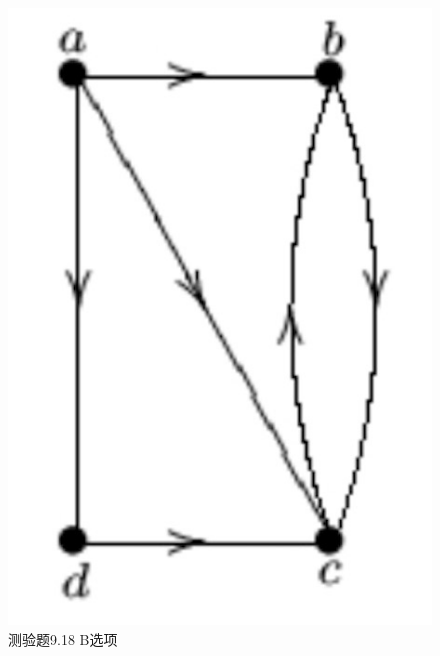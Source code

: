 \documentclass[UTF8, heading=true]{ctexart}
\begin{document}
\begin{figure}[H]
\begin{minipage}[t]{0.2\textwidth}
      \includegraphics[width=1\textwidth]{9.17_2.jpg} %
      \vspace{-0.3cm}
      \caption{测验题9.18 B选项}
\end{minipage}
\end{figure}
\end{document}

